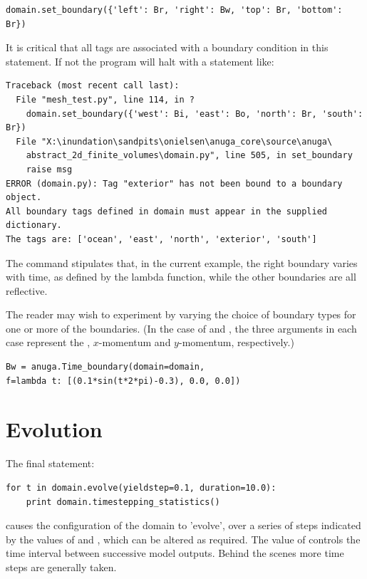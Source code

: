 \documentclass{manual}
\begin{document}
\begin{verbatim}
domain.set_boundary({'left': Br, 'right': Bw, 'top': Br, 'bottom': Br})
\end{verbatim}

It is critical that all tags are associated with a boundary condition in this statement.
If not the program will halt with a statement like:

\begin{verbatim}
Traceback (most recent call last):
  File "mesh_test.py", line 114, in ?
    domain.set_boundary({'west': Bi, 'east': Bo, 'north': Br, 'south': Br})
  File "X:\inundation\sandpits\onielsen\anuga_core\source\anuga\
    abstract_2d_finite_volumes\domain.py", line 505, in set_boundary
    raise msg
ERROR (domain.py): Tag "exterior" has not been bound to a boundary object.
All boundary tags defined in domain must appear in the supplied dictionary.
The tags are: ['ocean', 'east', 'north', 'exterior', 'south']
\end{verbatim}

The command  stipulates that, in the current example, the right
boundary varies with time, as defined by the lambda function, while the other
boundaries are all reflective.

The reader may wish to experiment by varying the choice of boundary
types for one or more of the boundaries. (In the case of \code{Bd}
and \code{Bw}, the three arguments in each case represent the
, $x$-momentum and $y$-momentum, respectively.)

\begin{verbatim}
Bw = anuga.Time_boundary(domain=domain, 
f=lambda t: [(0.1*sin(t*2*pi)-0.3), 0.0, 0.0])
\end{verbatim}

\section{Evolution}

The final statement: 

\begin{verbatim}
for t in domain.evolve(yieldstep=0.1, duration=10.0):
    print domain.timestepping_statistics()
\end{verbatim}

causes the configuration of the domain to 'evolve', over a series of
steps indicated by the values of  and
, which can be altered as required.  The value of
\code{yieldstep} controls the time interval between successive model
outputs.  Behind the scenes more time steps are generally taken.
\end{document}

